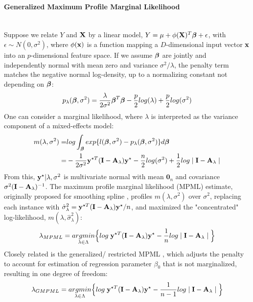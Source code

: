 \documentclass[11pt]{article}
\begin{document}
\paragraph{Generalized Maximum Profile Marginal Likelihood}\mbox{}\\
Suppose we relate $Y$ and ${\bf X}$ by a linear model, $Y=\mu+\phi({\bf X})^T\boldsymbol{\beta}+\epsilon$, with $\epsilon \sim N(0, \sigma^2)$, where $\phi({\bf x})$ is a function mapping a $D$-dimensional input vector ${\bf x}$ into an $p$-dimensional feature space. If we assume $\boldsymbol{\beta}$ are jointly and independently normal with mean zero and variance $\sigma^2/\lambda$, the penalty term matches the negative normal log-density, up to a normalizing constant not depending on $\boldsymbol{\beta}$:
\begin{align*}
p_\lambda(\boldsymbol{\beta}, \sigma^2)=\frac{\lambda}{2\sigma^2}\boldsymbol{\beta}^T\boldsymbol{\beta}-\frac{p}{2}log(\lambda)+\frac{p}{2}log(\sigma^2)
\end{align*}
One can consider a marginal likelihood, where $\lambda$ is interpreted as the variance component of a mixed-effects model:
\begin{align*}
m(\lambda, \sigma^2)=&log \int_{\boldsymbol{\beta}} exp\{ l(\boldsymbol{\beta}, \sigma^2)-p_\lambda(\boldsymbol{\beta}, \sigma^2)\}d\boldsymbol{\beta} \\=&-\frac{1}{2\sigma^2}{\bf y}^{\star T}({\bf I}-{\bf A}_\lambda){\bf y}^\star-\frac{n}{2}log(\sigma^2)+\frac{1}{2}log \mid {\bf I}-{\bf A}_\lambda \mid
\end{align*}
From this, ${\bf y}^\star |\lambda, \sigma^2$ is multivariate normal with mean $\mathbf{0}_n$ and covariance $\sigma^2({\bf I}-{\bf A}_\lambda)^{-1}$. The maximum profile marginal likelihood (MPML) estimate, originally proposed for smoothing spline \citep{wecker_signal_1983}, profiles $m(\lambda, \sigma^2)$ over $\sigma^2$, replacing each instance with $\hat{\sigma}_\lambda^2={\bf y}^{\star T}({\bf I}-{\bf A}_\lambda){\bf y}^\star/n$, and maximized the "concentrated" log-likelihood, $m(\lambda, \hat{\sigma}_\lambda^2)$:
\begin{align*}
\lambda_{MPML}=\underset{\lambda \in \Lambda}{argmin}\Big\{log\; {\bf y}^{\star T}({\bf I}-{\bf A}_\lambda){\bf y}^\star-\frac{1}{n}log \mid {\bf I}-{\bf A}_\lambda \mid \Big\}
\end{align*}
Closely related is the generalized/ restricted MPML \citep{harville_maximum_1977, wahba_comparison_1985}, which adjusts the penalty to account for estimation of regression parameter $\beta_0$ that is not marginalized, resulting in one degree of freedom:
\begin{align}
\lambda_{GMPML}=\underset{\lambda \in \Lambda}{argmin}\Big\{log\; {\bf y}^{\star T}({\bf I}-{\bf A}_\lambda){\bf y}^\star-\frac{1}{n-1}log \mid {\bf I}-{\bf A}_\lambda \mid \Big\} \label{5}
\end{align}
\end{document}
